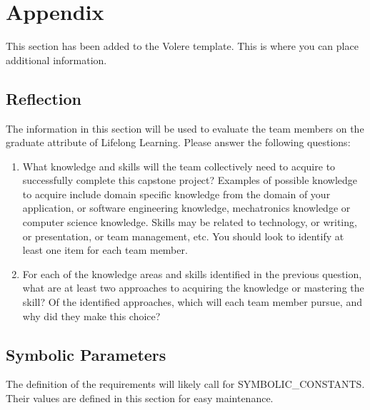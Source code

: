 \documentclass[12pt]{article}
\begin{document}
\section{Appendix}

This section has been added to the Volere template. This is where you can place additional
information.

\newpage{}
\subsection{Reflection}

The information in this section will be used to evaluate the team members on the graduate attribute
of Lifelong Learning. Please answer the following questions:

\begin{enumerate}
	\item What knowledge and skills will the team collectively need to acquire to successfully complete this
	      capstone project? Examples of possible knowledge to acquire include domain specific knowledge from
	      the domain of your application, or software engineering knowledge, mechatronics knowledge or
	      computer science knowledge. Skills may be related to technology, or writing, or presentation, or
	      team management, etc. You should look to identify at least one item for each team member.
	\item For each of the knowledge areas and skills identified in the previous question, what are at least
	      two approaches to acquiring the knowledge or mastering the skill? Of the identified approaches,
	      which will each team member pursue, and why did they make this choice?
\end{enumerate}

\subsection{Symbolic Parameters}

The definition of the requirements will likely call for SYMBOLIC\_CONSTANTS. Their values are
defined in this section for easy maintenance.
\end{document}

